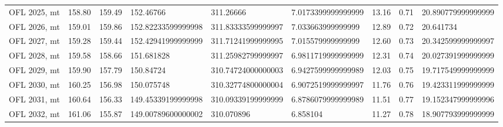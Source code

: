 \documentclass[11pt,
  english,
  a4paper,
]{article}
\begin{document}
\begin{table}
{\begin{tabular}[t]{>{\raggedright\arraybackslash}p{2in}llllllll}
OFL 2025, mt & 158.80 & 159.49 & 152.46766 & 311.26666 & 7.0173399999999999 & 13.16 & 0.71 & 20.890779999999999\\
OFL 2026, mt & 159.01 & 159.86 & 152.82233599999998 & 311.83333599999997 & 7.033663999999999 & 12.89 & 0.72 & 20.641734\\
OFL 2027, mt & 159.28 & 159.44 & 152.42941999999999 & 311.71241999999995 & 7.015579999999999 & 12.60 & 0.73 & 20.342599999999997\\
\addlinespace
OFL 2028, mt & 159.58 & 158.66 & 151.681828 & 311.25982799999997 & 6.9811719999999999 & 12.31 & 0.74 & 20.027391999999999\\
OFL 2029, mt & 159.90 & 157.79 & 150.84724 & 310.74724000000003 & 6.9427599999999989 & 12.03 & 0.75 & 19.717549999999999\\
OFL 2030, mt & 160.25 & 156.98 & 150.075748 & 310.32774800000004 & 6.9072519999999997 & 11.76 & 0.76 & 19.423311999999999\\
OFL 2031, mt & 160.64 & 156.33 & 149.45339199999998 & 310.09339199999999 & 6.8786079999999989 & 11.51 & 0.77 & 19.152347999999996\\
OFL 2032, mt & 161.06 & 155.87 & 149.00789600000002 & 310.070896 & 6.858104 & 11.27 & 0.78 & 18.907793999999999\\
\bottomrule
\end{tabular}}
\end{table}
\end{document}
